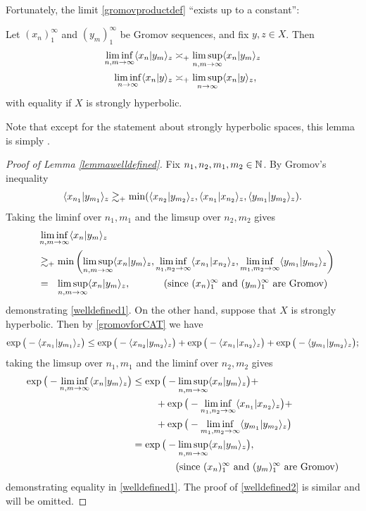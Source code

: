 Fortunately, the limit \eqref{gromovproductdef} ``exists up to a constant'':
\begin{lemma}
\label{lemmawelldefined}
Let $(x_n)_1^\infty$ and $(y_m)_1^\infty$ be Gromov sequences, and fix $y,z\in X$. Then
\begin{align} \label{welldefined1}
\liminf_{n,m\to\infty}\langle x_n|y_m\rangle_z &\asymp_+ \limsup_{n,m\to\infty}\langle x_n|y_m\rangle_z\\ \label{welldefined2}
\liminf_{n\to\infty}\langle x_n|y\rangle_z &\asymp_+ \limsup_{n\to\infty}\langle x_n|y\rangle_z ,
\end{align}
with equality if $X$ is strongly hyperbolic.
\end{lemma}
Note that except for the statement about strongly hyperbolic spaces, this lemma is simply \cite[Lemma 5.6]{Vaisala}.
\begin{proof}[Proof of Lemma \ref{lemmawelldefined}]
Fix $n_1,n_2,m_1,m_2\in\Namer$. By Gromov's inequality
\[
\langle x_{n_1}|y_{m_1}\rangle_z \gtrsim_+ \min(\langle x_{n_2}|y_{m_2}\rangle_z,\langle x_{n_1}|x_{n_2}\rangle_z,\langle y_{m_1}|y_{m_2}\rangle_z).
\]
Taking the liminf over $n_1,m_1$ and the limsup over $n_2,m_2$ gives
\begin{align*}
&\liminf_{n,m\to\infty}\lb x_n|y_m \rb_z\\ 
&\gtrsim_\plus \min\left(\limsup_{n,m\to\infty}\lb x_n|y_m \rb_z,\liminf_{n_1,n_2\to\infty}\lb x_{n_1}|x_{n_2}\rb_z,\liminf_{m_1,m_2\to\infty}\lb y_{m_1}|y_{m_2}\rb_z\right) \noreason\\
&=_\pt \limsup_{n,m\to\infty}\lb x_n|y_m\rb_z, \phantom{XxX}\since{$(x_n)_1^\infty$ and $(y_m)_1^\infty$ are Gromov}
\end{align*}
demonstrating \eqref{welldefined1}. On the other hand, suppose that $X$ is strongly hyperbolic. Then by \eqref{gromovforCAT} we have
\[
\exp\big(-\langle x_{n_1}|y_{m_1}\rangle_z\big) \leq \exp\big(-\langle x_{n_2}|y_{m_2}\rangle_z\big) + \exp\big(-\langle x_{n_1}|x_{n_2}\rangle_z\big) + \exp\big(-\langle y_{m_1}|y_{m_2}\rangle_z\big);
\]
taking the limsup over $n_1,m_1$ and the liminf over $n_2,m_2$ gives
\begin{align*}
\exp \big(-\liminf_{n,m\to\infty}\lb x_n|y_m\rb_z\big) &\leq \exp\big(-\limsup_{n,m\to\infty}\lb x_n|y_m \rb_z\big) +\\
&\phantom{XxX}+ \exp\big(-\liminf_{n_1,n_2\to\infty}\lb x_{n_1}|x_{n_2}\rb_z\big) +\\ 
&\phantom{XxX}+ \exp\big(-\liminf_{m_1,m_2\to\infty}\lb y_{m_1}|y_{m_2}\rb_z\big) \noreason\\
&= \exp\big(-\limsup_{n,m\to\infty}\lb x_n|y_m\rb_z\big),\\ 
&\phantom{XxXxXx}\text{(since $(x_n)_1^\infty$ and $(y_m)_1^\infty$ are Gromov)}
\end{align*}
demonstrating equality in \eqref{welldefined1}. The proof of \eqref{welldefined2} is similar and will be omitted.
\end{proof}

